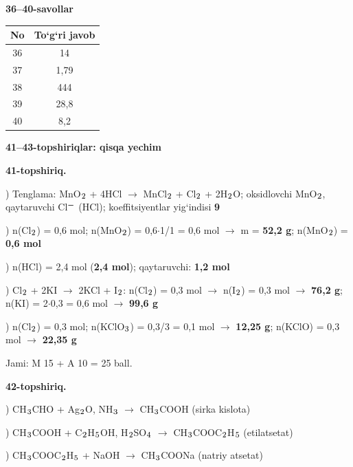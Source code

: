 \documentclass[11pt,a4paper]{article}
\renewcommand{\textsubscript}[1]{\ensuremath{_{\text{\fontsize{8}{8}\selectfont #1}}}}
\renewcommand{\textsuperscript}[1]{\ensuremath{^{\text{\fontsize{8}{8}\selectfont #1}}}}
\begin{document}
\noindent\textbf{36--40-savollar}\par\smallskip
\noindent\begin{tabular}{|c|c|}\hline \textbf{No} & \textbf{To`g`ri javob}\\\hline
36 & 14\\\hline
37 & 1,79\\\hline
38 & 444\\\hline
39 & 28,8\\\hline
40 & 8,2\\\hline
\end{tabular}\par\medskip
\noindent\textbf{41--43-topshiriqlar: qisqa yechim}\par\smallskip
\noindent\textbf{41-topshiriq.}\par
{}) Tenglama: MnO\textsubscript{2} + 4HCl $\to$ MnCl\textsubscript{2} + Cl\textsubscript{2} + 2H\textsubscript{2}O; oksidlovchi MnO\textsubscript{2}, qaytaruvchi Cl\textsuperscript{$-$} (HCl); koeffitsiyentlar yig`indisi \textbf{9}\par
{}) n(Cl\textsubscript{2}) = 0,6 mol; n(MnO\textsubscript{2}) = 0,6$\cdot$1/1 = 0,6 mol $\to$ m = \textbf{52,2 g}; n(MnO\textsubscript{2}) = \textbf{0,6 mol}\par
{}) n(HCl) = 2,4 mol (\textbf{2,4 mol}); qaytaruvchi: \textbf{1,2 mol}\par
{}) Cl\textsubscript{2} + 2KI $\to$ 2KCl + I\textsubscript{2}: n(Cl\textsubscript{2}) = 0,3 mol $\to$ n(I\textsubscript{2}) = 0,3 mol $\to$ \textbf{76,2 g}; n(KI) = 2$\cdot$0,3 = 0,6 mol $\to$ \textbf{99,6 g}\par
{}) n(Cl\textsubscript{2}) = 0,3 mol; n(KClO\textsubscript{3}) = 0,3/3 = 0,1 mol $\to$ \textbf{12,25 g}; n(KClO) = 0,3 mol $\to$ \textbf{22,35 g}\par
\noindent Jami: M 15 + A 10 = 25 ball.\par
\noindent\textbf{42-topshiriq.}\par
{}) CH\textsubscript{3}CHO + Ag\textsubscript{2}O, NH\textsubscript{3} $\to$ CH\textsubscript{3}COOH (sirka kislota)\par
{}) CH\textsubscript{3}COOH + C\textsubscript{2}H\textsubscript{5}OH, H\textsubscript{2}SO\textsubscript{4} $\to$ CH\textsubscript{3}COOC\textsubscript{2}H\textsubscript{5} (etilatsetat)\par
{}) CH\textsubscript{3}COOC\textsubscript{2}H\textsubscript{5} + NaOH $\to$ CH\textsubscript{3}COONa (natriy atsetat)\par
\end{document}
